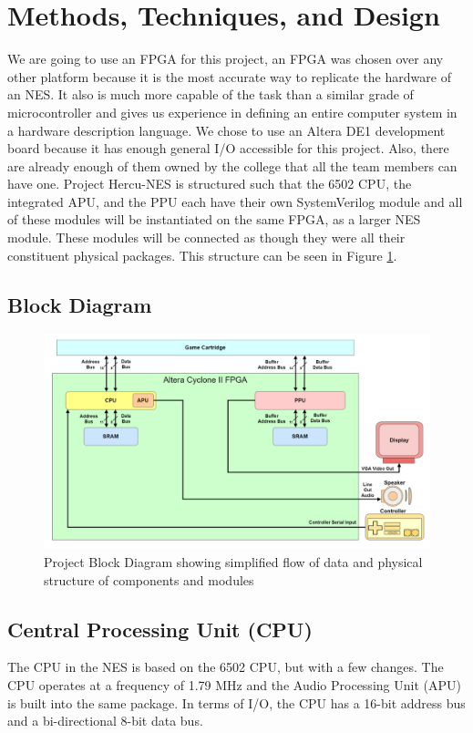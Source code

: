 \documentclass[a4paper]{article}
\begin{document}
\section{Methods, Techniques, and Design}
We are going to use an FPGA for this project, an FPGA was chosen over any other platform because it is the most accurate way to replicate the hardware of an NES. It also is much more capable of the task than a similar grade of microcontroller and gives us experience in defining an entire computer system in a hardware description language. We chose to use an Altera DE1 development board because it has enough general I/O accessible for this project. Also, there are already enough of them owned by the college that all the team members can have one. Project Hercu-NES is structured such that the 6502 CPU, the integrated APU, and the PPU each have their own SystemVerilog module and all of these modules will be instantiated on the same FPGA, as a larger NES module. These modules will be connected as though they were all their constituent physical packages. This structure can be seen in Figure \ref{fig:BlockDiagram}. 

\subsection{Block Diagram}
\begin{figure}[H]
\centering
\includegraphics[width=\textwidth]{Capture.PNG}
\caption{\label{fig:BlockDiagram}Project Block Diagram showing simplified flow of data and physical structure of components and modules}
\end{figure}

\subsection{Central Processing Unit (CPU)}
The CPU in the NES is based on the 6502 CPU, but with a few changes. The CPU operates at a frequency of 1.79 MHz and the Audio Processing Unit (APU) is built into the same package. In terms of I/O, the CPU has a 16-bit address bus and a bi-directional 8-bit data bus.\cite{nesdev}
\end{document}
